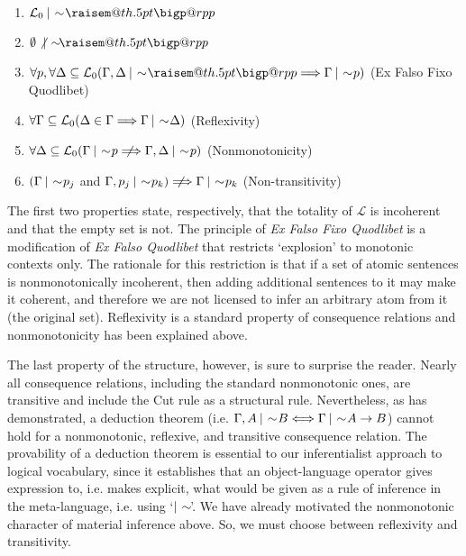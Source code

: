 \documentclass{article}                     %
\makeatletter
\newcommand{\raisemath}[1]{\mathpalette{\raisem@th{#1}}}
\newcommand{\raisem@th}[3]{\raisebox{#1}{$#2#3$}}
\newcommand{\nmc}{%
	\mathbin{\mathpalette\nm@\expandafter}
}
\newcommand{\nm@}{\mid\joinrel\mkern-.5mu\sim\mkern-3mu}
\newcommand{\nnmc}{\not\nmc}
\newcommand{\bigperpp}{%
	\mathop{\mathpalette\bigp@rpp\relax}%
	\displaylimits
}
\newcommand{\bigp@rpp}[2]{%
	\vcenter{
		\m@th\hbox{\scalebox{\ifx#1\displaystyle1.3\else1.3\fi}{$#1\perp$}}
	}%
}
\newcommand{\bigperp}{\raisemath{.5pt}{\bigperpp}}
\makeatother
\begin{document}
\begin{enumerate}
	\item $ \mathcal{L}_0\nmc\bigperp$
	\item $ \emptyset\nnmc\bigperp $
	\item $ \forall p, \forall\Delta\subseteq\mathcal{L}_0(\Gamma, \Delta \nmc\bigperp \Longrightarrow \Gamma\nmc p) $ (Ex Falso Fixo Quodlibet)
	\item $\forall \Gamma\subseteq\mathcal{L}_0 (\Delta \in \Gamma \Longrightarrow \Gamma\nmc \Delta)$ (Reflexivity)
	\item $\forall\Delta\subseteq\mathcal{L}_0(\Gamma\nmc p \,\,\not\!\!\Longrightarrow \Gamma, \Delta \nmc p)$ (Nonmonotonicity)
	\item $(\Gamma\nmc p_j $ and $ \Gamma, p_j \nmc p_k ) \,\,\not\!\!\Longrightarrow \Gamma \nmc p_k$ (Non-transitivity)
\end{enumerate}

The first two properties state, respectively, that the totality of $ \mathcal{L} $ is incoherent and that the empty set is not. The principle of \textit{Ex Falso Fixo Quodlibet} is a modification of \textit{Ex Falso Quodlibet} that restricts `explosion' to monotonic contexts only. The rationale for this restriction is that if a set of atomic sentences is nonmonotonically incoherent, then adding additional sentences to it may make it coherent, and therefore we are not licensed to infer an arbitrary atom from it (the original set). Reflexivity is a standard property of consequence relations and nonmonotonicity has been explained above. 

The last property of the structure, however, is sure to surprise the reader. Nearly all consequence relations, including the standard nonmonotonic ones, are transitive and include the Cut rule as a structural rule. Nevertheless, as \textcite{Morgan2000} has demonstrated,  a deduction theorem (i.e. $\Gamma, A \nmc B \Longleftrightarrow \Gamma \nmc A \rightarrow B $) cannot hold for a nonmonotonic, reflexive, and transitive consequence relation.  The provability of a deduction theorem is essential to our inferentialist approach to logical vocabulary, since it establishes that an object-language operator gives expression to, i.e. makes explicit, what would be given as a rule of inference in the meta-language, i.e. using `$ \nmc $'. We have already motivated the nonmonotonic character of material inference above. So, we must choose between  reflexivity and transitivity. 
\end{document}
